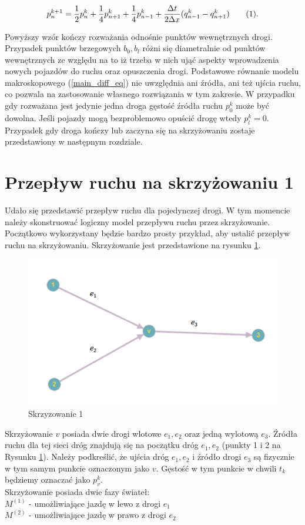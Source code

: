 \documentclass[12pt]{book}
\newcommand\addtag{\refstepcounter{equation}\tag{\theequation}}
\begin{document}
\[ p_n^{k+1} =\frac{1}{2}p_n^k+\frac{1}{4}p_{n+1}^k+\frac{1}{4}p_{n-1}^k  +\frac{\Delta t}{2\Delta x}(q^k_{n-1}-q^k_{n+1})  \addtag \label{eq:final_normal_development}.\]


Powyższy wzór kończy rozważania odnośnie punktów wewnętrznych drogi.
Przypadek punktów brzegowych $b_0,b_l$ różni się diametralnie od punktów wewnętrznych ze względu na to iż trzeba w nich ująć aspekty wprowadzenia nowych pojazdów do ruchu oraz opuszczenia drogi. Podstawowe równanie modelu makroskopowego (\ref{main_diff_eq}) nie uwzględnia ani źródła, ani też ujścia ruchu, co pozwala na zastosowanie własnego rozwiązania w tym zakresie. W przypadku gdy rozważana jest jedynie jedna droga gęstość źródła ruchu $p_0^k$ może być dowolna. Jeśli pojazdy mogą bezproblemowo opuścić drogę wtedy $p_l^k=0$. Przypadek gdy droga kończy lub zaczyna się na skrzyżowaniu zostaje przedstawiony w następnym rozdziale.

\section{Przepływ ruchu na skrzyżowaniu 1}
Udało się przedstawić przepływ ruchu dla pojedynczej drogi. W tym momencie należy skonstruować logiczny model przepływu ruchu przez skrzyżowanie. Początkowo wykorzystany będzie bardzo prosty przykład, aby ustalić przepływ ruchu na skrzyżowaniu. Skrzyżowanie jest przedstawione na rysunku \ref{fig:skrz_1}.
\begin{figure}[H]
  \centering
    \includegraphics[width=14cm]{skrz_1}
 \caption{Skrzyzowanie 1}
 \label{fig:skrz_1}
\end{figure}
Skrzyżowanie $v$ posiada dwie drogi wlotowe $e_1,e_2$ oraz jedną wylotową $e_3$. Źródła ruchu dla tej sieci dróg znajdują się na początku dróg $e_1,e_2$ (punkty 1 i 2 na Rysunku \ref{fig:skrz_1}). Należy podkreślić, że ujścia dróg $e_1,e_2$ i źródło drogi $e_3$ są fizycznie w tym samym punkcie oznaczonym jako $v$. Gęstość w tym punkcie w chwili $t_k$ będziemy oznaczać jako $p_v^k$.\\
Skrzyżowanie posiada dwie fazy świateł:\\
$M^{(1)}$ - umożliwiające jazdę w lewo z drogi $e_1$\\
$M^{(2)}$ - umożliwiające jazdę w prawo z drogi $e_2$ \\
\end{document}
